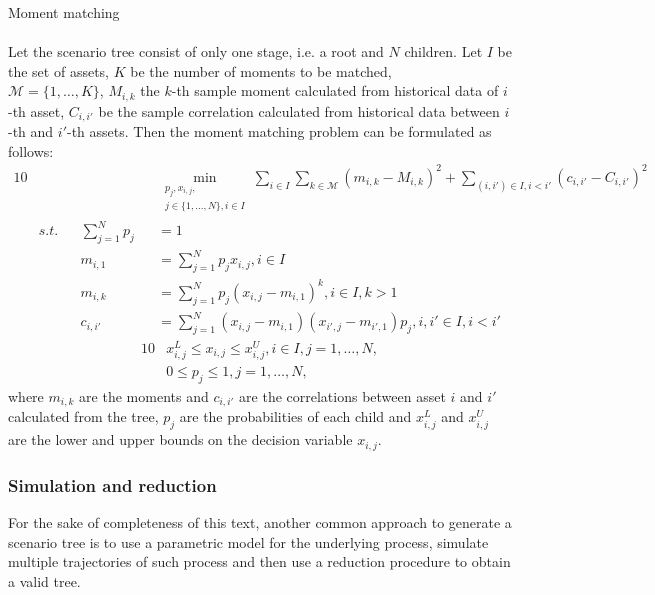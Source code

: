 \begin{defn}{Moment matching \label{defn:moment_matching_method}
\\
\cite[p. 9]{moment_matching_agarwal}}
\\
Let the scenario tree consist of only one stage, i.e. a root and $N$ children. Let $I$ be the set of assets, $K$ be the number of moments to be matched, \\ $\mathcal{M}=\{1,\dots,K\}$, $M_{i,k}$ the $k$-th sample moment calculated from historical data of $i$-th asset, $C_{i,i'}$ be the sample correlation calculated from historical data between $i$-th and $i'$-th assets. Then the moment matching problem can be formulated as follows:
\begin{alignat}{10}
& && && \underset{\substack{p_j, x_{i,j}, \\ j \in \{1,...,N\}, i \in I}}{\min} \sum_{i\in I} \sum_{k\in \mathcal{M}} \left(m_{i,k} - M_{i,k}\right)^2 + \sum_{(i, i') \in I, i < i'}(c_{i,i'}-C_{i,i'})^2 \nonumber \\
& s.t. && \sum_{j=1}^N p_j&&=1 \nonumber \\
& && m_{i,1}&&=\sum_{j=1}^N p_jx_{i,j}, i \in I \nonumber \\
& && m_{i,k}&&=\sum_{j=1}^N p_j(x_{i,j}-m_{i,1})^k, i \in I, k>1 \nonumber \\
& && c_{i,i'}&&=\sum_{j=1}^N(x_{i,j}-m_{i,1})(x_{i',j}-m_{i',1})p_j, i,i' \in I, i<i' \nonumber
\end{alignat}
\vspace{-0.5cm}
\begin{alignat}{10}
& x_{i,j}^L \leq x_{i,j} \leq x_{i,j}^U, i \in I, j=1,\dots,N, \nonumber \\
& 0 \leq p_j \leq 1, j=1,\dots,N, \nonumber
\end{alignat}
where $m_{i,k}$ are the moments and $c_{i,i'}$ are the correlations between asset $i$ and $i'$ calculated from the tree, $p_j$ are the probabilities of each child and $x_{i,j}^L$ and $x_{i,j}^U$ are the lower and upper bounds on the decision variable $x_{i,j}$.
\end{defn}


\subsubsection{Simulation and reduction}
For the sake of completeness of this text, another common approach to generate a scenario tree is to use a parametric model for the underlying process, simulate multiple trajectories of such process and then use a reduction procedure to obtain a valid tree. 

